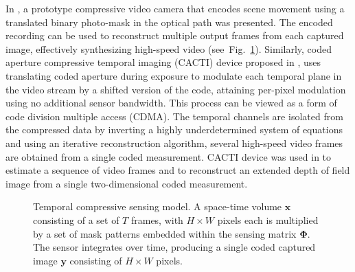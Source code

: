 \documentclass[journal]{IEEEtran}
\begin{document}
In \cite{Koller2015}, a prototype compressive video camera that encodes scene movement using a translated binary photo-mask in the optical path was presented. The encoded recording can be used to reconstruct multiple output frames from each captured image, effectively synthesizing high-speed video (see~Fig.~\ref{fig:temporal_cs}). Similarly, coded aperture compressive temporal imaging (CACTI) device proposed in \cite{Llull2013}, uses translating coded aperture during exposure to modulate each temporal plane in the video stream by a shifted version of the code, attaining per-pixel modulation using no additional sensor bandwidth. This process can be viewed as a form of code division multiple access (CDMA). The temporal channels are isolated from the compressed data by inverting a highly underdetermined system of equations and using an iterative reconstruction algorithm, several high-speed video frames are obtained from a single coded measurement. CACTI device was used in \cite{Llull2014} to estimate a sequence of video frames and to reconstruct an extended depth of field image from a single two-dimensional coded measurement.
%
\begin{figure}
	\centering
	
	\caption{Temporal compressive sensing model. A space-time volume $\boldsymbol{x}$ consisting of a set of $T$ frames, with $H\times W$ pixels each is multiplied by a set of mask patterns embedded within the sensing matrix $\boldsymbol{\Phi}$. The sensor integrates over time, producing a single coded captured image $\boldsymbol{y}$ consisting of $H\times W$ pixels. \cite{Koller2015}}
	
	\label{fig:temporal_cs}
\end{figure}
\end{document}
